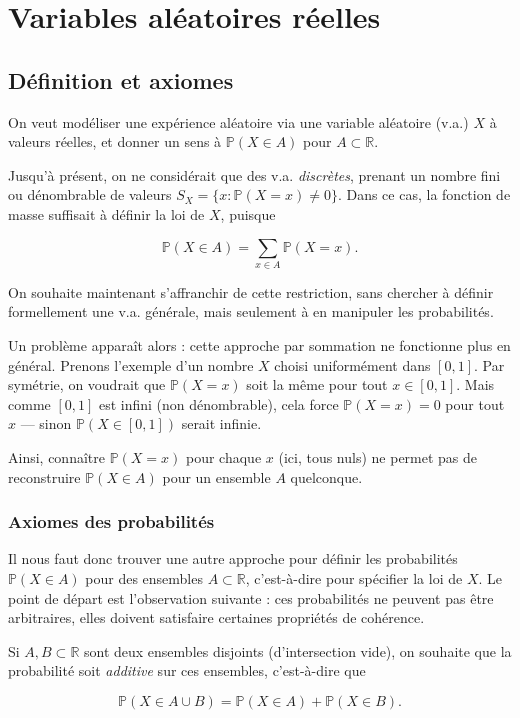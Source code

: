 \chapter{Variables aléatoires réelles}

\section{Définition et axiomes}

On veut modéliser une expérience aléatoire via une variable aléatoire (v.a.) $X$ à valeurs réelles, et donner un sens à $\mathbb{P}(X \in A)$ pour $A \subset \mathbb{R}$.

Jusqu'à présent, on ne considérait que des v.a. \textit{discrètes}, prenant un nombre fini ou dénombrable de valeurs $S_X = \{x : \mathbb{P}(X=x) \neq 0\}$. Dans ce cas, la fonction de masse suffisait à définir la loi de $X$, puisque

$$
\mathbb{P}(X \in A) = \sum_{x \in A} \mathbb{P}(X = x).
$$

On souhaite maintenant s'affranchir de cette restriction, sans chercher à définir formellement une v.a. générale, mais seulement à en manipuler les probabilités.

Un problème apparaît alors : cette approche par sommation ne fonctionne plus en général. Prenons l'exemple d'un nombre $X$ choisi uniformément dans $[0,1]$. Par symétrie, on voudrait que $\mathbb{P}(X=x)$ soit la même pour tout $x \in [0,1]$. Mais comme $[0,1]$ est infini (non dénombrable), cela force $\mathbb{P}(X=x) = 0$ pour tout $x$ — sinon $\mathbb{P}(X \in [0,1])$ serait infinie.

Ainsi, connaître $\mathbb{P}(X=x)$ pour chaque $x$ (ici, tous nuls) ne permet pas de reconstruire $\mathbb{P}(X \in A)$ pour un ensemble $A$ quelconque.

\subsection{Axiomes des probabilités}

Il nous faut donc trouver une autre approche pour définir les probabilités $\mathbb{P}(X \in A)$ pour des ensembles $A \subset \mathbb{R}$, c'est-à-dire pour spécifier la loi de $X$. Le point de départ est l'observation suivante : ces probabilités ne peuvent pas être arbitraires, elles doivent satisfaire certaines propriétés de cohérence.

\medskip

\begin{mdframed}
\begin{definition}
Si $A, B \subset \mathbb{R}$ sont deux ensembles disjoints (d'intersection vide), on souhaite que la probabilité soit \textit{additive} sur ces ensembles, c'est-à-dire que

$$
\mathbb{P}(X \in A \cup B) = \mathbb{P}(X \in A) + \mathbb{P}(X \in B).
$$
\end{definition}
\end{mdframed}

